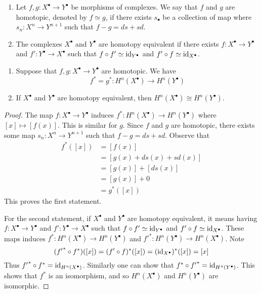 \begin{defn}
    \hfill

    \begin{enumerate}
        \item Let $f,g: X^\bullet \to Y^\bullet$ be morphisms of complexes. We say that $f$ and $g$ are homotopic, denoted by $f\simeq g$, if there exists $s_\bullet$ be a collection of map where $s_n: X^n \to Y^{n+1}$ such that $f-g = ds + sd$.
        \item The complexes $X^\bullet$ and $Y^\bullet$ are homotopy equivalent if there exists $f:X^\bullet \to Y^\bullet$ and $f':Y^\bullet \to X^\bullet$ such that $f\circ f' \simeq \operatorname{id}_{Y^\bullet}$ and $f'\circ f \simeq \operatorname{id}_{X^\bullet}$. 
    \end{enumerate}
\end{defn}

\medskip

\begin{pro}
    \hfill

    \begin{enumerate}
        \item Suppose that $f,g:X^\bullet \to Y^\bullet$ are homotopic. We have 
        \[f^* = g^* : H^n (X^\bullet) \to H^n(Y^\bullet)\]
        \item If $X^\bullet$ and $Y^\bullet$ are homotopy equivalent, then $H^n(X^\bullet)\cong H^n(Y^\bullet)$.
    \end{enumerate}
\end{pro}
\begin{proof}
    The map $f:X^\bullet \to Y^\bullet$ induces $f^*: H^n(X^\bullet)\to H^n(Y^\bullet)$ where $[x]\mapsto [f(x)]$. This is similar for $g$. Since $f$ and $g$ are homotopic, there exists some map $s_n:X^n \to Y^{n+1}$ such that $f-g = ds + sd$. Observe that
    \begin{align*}
        f^*([x])
        &= [f(x)] \\
        &= [g(x)+ds(x) + sd(x)]\\
        &= [g(x)] + [ds(x)]\\
        &= [g(x)] + 0\\
        &= g^*([x])
    \end{align*}
    This proves the first statement.

    For the second statement, if $X^\bullet$ and $Y^\bullet$ are homotopy equivalent, it means having $f:X^\bullet\to Y^\bullet$ and $f':Y^\bullet\to X^\bullet$ such that $f\circ f' \simeq \operatorname{id}_{Y^\bullet}$ and $f'\circ f \simeq \operatorname{id}_{X^\bullet}$. These maps induces $f^*:H^n(X^\bullet) \to H^n(Y^\bullet)$ and ${f'}^*:H^n(Y^\bullet) \to H^n(X^\bullet)$. Note
    \[({f'}^*\circ f^*)([x]) = (f'\circ f)^*([x]) = (\operatorname{id}_{X^\bullet})^*([x]) = [x]\]
    Thus ${f'}^*\circ f^* = \operatorname{id}_{H^n(X^\bullet)}$. Similarly one can show that ${f}^*\circ {f'}^* = \operatorname{id}_{H^n(Y^\bullet)}$. This shows that $f^*$ is an isomorphism, and so $H^n(X^\bullet)$ and $H^n(Y^\bullet)$ are isomorphic.
\end{proof}

